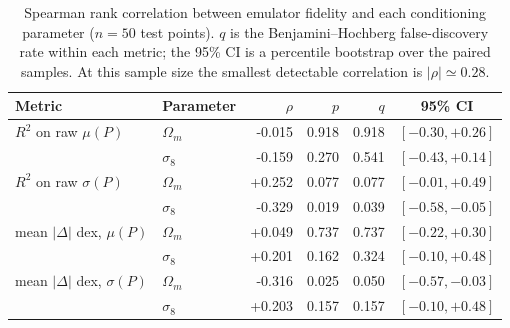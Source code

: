 \begin{table}[htbp]
    \centering
    \caption{Spearman rank correlation between emulator fidelity and each conditioning parameter ($n=50$ test points). $q$ is the Benjamini--Hochberg false-discovery rate within each metric; the 95\% CI is a percentile bootstrap over the paired samples. At this sample size the smallest detectable correlation is $|\rho|\simeq0.28$.}
    \label{tab:spearman_fidelity}
    \begin{tabular}{llrrrc}
        \toprule
        Metric & Parameter & $\rho$ & $p$ & $q$ & 95\% CI \\
        \midrule
        $R^2$ on raw $\mu(P)$ & $\Omega_m$ & -0.015 & 0.918 & 0.918 & $[-0.30, +0.26]$ \\
         & $\sigma_8$ & -0.159 & 0.270 & 0.541 & $[-0.43, +0.14]$ \\
        \midrule
        $R^2$ on raw $\sigma(P)$ & $\Omega_m$ & +0.252 & 0.077 & 0.077 & $[-0.01, +0.49]$ \\
         & $\sigma_8$ & -0.329 & 0.019 & 0.039 & $[-0.58, -0.05]$ \\
        \midrule
        mean $|\Delta|$ dex, $\mu(P)$ & $\Omega_m$ & +0.049 & 0.737 & 0.737 & $[-0.22, +0.30]$ \\
         & $\sigma_8$ & +0.201 & 0.162 & 0.324 & $[-0.10, +0.48]$ \\
        \midrule
        mean $|\Delta|$ dex, $\sigma(P)$ & $\Omega_m$ & -0.316 & 0.025 & 0.050 & $[-0.57, -0.03]$ \\
         & $\sigma_8$ & +0.203 & 0.157 & 0.157 & $[-0.10, +0.48]$ \\
        \bottomrule
    \end{tabular}
\end{table}
